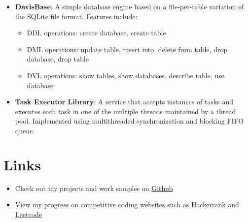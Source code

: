 \documentclass[letterpaper,11pt]{article}
\begin{document}
\begin{itemize}[noitemsep,nolistsep,leftmargin=*]
\item \textbf{DavisBase}: A simple database engine based on a file-per-table variation of the SQLite file format. Features include:
 \begin{itemize}[noitemsep,nolistsep,leftmargin=*]
\item DDL operations: create database, create table 
 \item DML operations: update table, insert into, delete from table, drop database, drop table
 \item DVL operations: show tables, show databases, describe table, use database
      \end{itemize}

\item \textbf{Task Executor Library}: A service that accepts instances of tasks and executes each task in one of the multiple threads maintained by a thread pool. Implemented using multithreaded synchronization and blocking FIFO queue.
 \end{itemize}
     

 
\section{Links}
\begin{itemize}[noitemsep,nolistsep,leftmargin=*]


\item Check out my projects and work samples on \href{https://www.github.com/psprao95}{Github}
\item View my progress on competitive coding websites such as \href{https://www.hackerrank.com/psprao95}{Hackerrank} and \href{https://www.leetcode.com/psprao95}{Leetcode}

\end{itemize}
 

 
 
 
\end{document}
